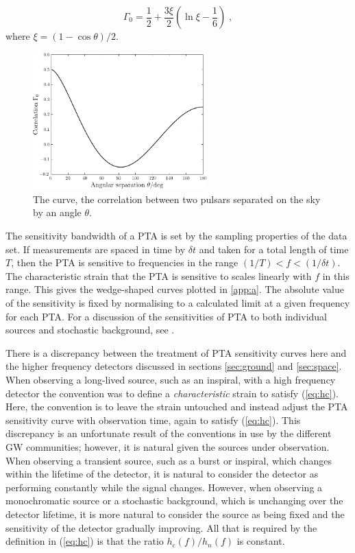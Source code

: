 \begin{equation}
\Gamma_{0} = \frac{1}{2}+\frac{3\xi}{2}\left(\ln \xi -\frac{1}{6}\right) \; ,
\end{equation}
where $\xi = (1-\cos\theta)/{2}.$
\begin{figure}
 \centering
 \includegraphics[trim=0cm 0cm 0cm 0cm, width=0.6\textwidth]{Fig_Hellings_Downs}
 \caption{The \citet{HellingsDowns} curve, the correlation between two pulsars separated on the sky by an angle $\theta$.}
 \label{fig:HnD}
\end{figure}

The sensitivity bandwidth of a PTA is set by the sampling properties of the data set. If measurements are spaced in time by $\delta t$ and taken for a total length of time $T$, then the PTA is sensitive to frequencies in the range $(1/T) < f < (1/\delta t)$. The characteristic strain that the PTA is sensitive to scales linearly with $f$ in this range. This gives the wedge-shaped curves plotted in \ref{app:a}. The absolute value of the sensitivity is fixed by normalising to a calculated limit at a given frequency for each PTA. For a discussion of the sensitivities of PTA to both individual sources and stochastic background, see \citet{MooreTaylorGair}.

There is a discrepancy between the treatment of PTA sensitivity curves here and the higher frequency detectors discussed in sections \ref{sec:ground} and \ref{sec:space}. When observing a long-lived source, such as an inspiral, with a high frequency detector the convention was to define a \emph{characteristic} strain to satisfy (\ref{eq:hc}). Here, the convention is to leave the strain untouched and instead adjust the PTA sensitivity curve with observation time, again to satisfy (\ref{eq:hc}). This discrepancy is an unfortunate result of the conventions in use by the different GW communities; however, it is natural given the sources under observation. When observing a transient source, such as a burst or inspiral, which changes within the lifetime of the detector, it is natural to consider the detector as performing constantly while the signal changes. However, when observing a monochromatic source or a stochastic background, which is unchanging over the detector lifetime, it is more natural to consider the source as being fixed and the sensitivity of the detector gradually improving. All that is required by the definition in (\ref{eq:hc}) is that the ratio $h_\mathrm{c}(f)/h_{n}(f)$ is constant.


